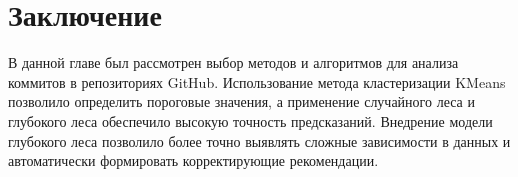 \section{Заключение} \label{ch2:conclusion}

В данной главе был рассмотрен выбор методов и алгоритмов для анализа коммитов в репозиториях GitHub. Использование метода кластеризации KMeans позволило определить пороговые значения, а применение случайного леса и глубокого леса обеспечило высокую точность предсказаний. Внедрение модели глубокого леса позволило более точно выявлять сложные зависимости в данных и автоматически формировать корректирующие рекомендации.
